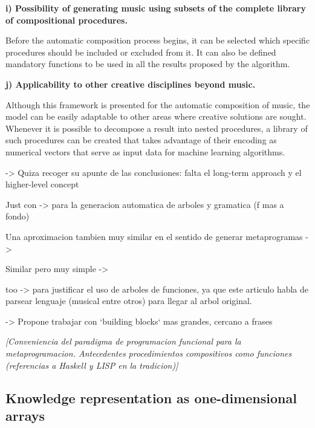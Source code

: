 \documentclass{article}
\begin{document}
\textbf{i) Possibility of generating music using subsets of the complete library of compositional procedures.}

Before the automatic composition process begins, it can be selected which specific procedures should be included or excluded from it. It can also be defined mandatory functions to be used in all the results proposed by the algorithm.

\textbf{j) Applicability to other creative disciplines beyond music.}

Although this framework is presented for the automatic composition of music, the model can be easily adaptable to other areas where creative solutions are sought. Whenever it is possible to decompose a result into nested procedures, a library of such procedures can be created that takes advantage of their encoding as numerical vectors that serve as input data for machine learning algorithms.


{\color{red}




\cite{Herremans:2017:FTM:3145473.3108242} -> Quiza recoger su apunte de las conclusiones: falta el long-term approach y el higher-level concept 




Just con \cite{Drewes_analgebra} -> para la generacion automatica de arboles y gramatica (f mas a fondo)

Una aproximacion tambien muy similar en el sentido de generar metaprogramas -> \cite{Spector_inductionand}

Similar pero muy simple -> \cite{Ando}

too \cite{Bod_thedata-oriented} -> para justificar el uso de arboles de funciones, ya que este articulo habla de parsear lenguaje (musical entre otros) para llegar al arbol original.

}



 
{\color{red}

\cite{DBLP:conf/icmc/Jacob95} -> Propone trabajar con `building blocks` mas grandes, cercano a frases
}


{\color{gray} \textsl{[Conveniencia del paradigma de programacion funcional para la metaprogramacion. Antecedentes procedimientos compositivos como funciones (referencias a Haskell y LISP en la tradicion)]}}





\subsection{Knowledge representation as one-dimensional arrays}
\end{document}
